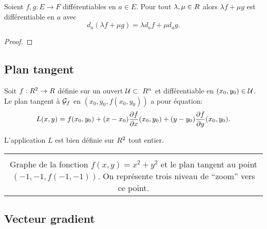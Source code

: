 \begin{proposition}
    Soient $f,g: E \to F$ différentiables en $a\in E$. Pour tout $\lambda,\mu\in R$ alors $\lambda f + \mu g$ est différentiable en $a$ avec 
    \[
        d_a (\lambda f + \mu g) = \lambda d_a f + \mu d_a g.
    \]
\end{proposition}

\begin{proof}
    \pl{\rep{4cm}}
\end{proof}

\sld{\vfill\pagebreak[5]}%
\subsection{Plan tangent}
\begin{proposition}
    Soit $f:R^2 \to R$ définie sur un ouvert $\U\subset  \R^n$ et différentiable en $(x_0,y_0) \in \mathcal{U}$. Le plan tangent à $\mathcal{G}_f$ en $(x_0,y_0,f(x_0,y_0))$ a pour équation:
    \[
        L(x,y) = f(x_0,y_0) + (x-x_0) \frac{\partial f}{\partial x}(x_0,y_0)  + (y-y_0) \frac{\partial f}{\partial y}(x_0,y_0). 
    \]
\end{proposition}

\begin{remark}
    L'application $L$ est bien définie sur $R^2$ tout entier.
\end{remark}

\begin{center}
    \begin{tabular}{c}
        {\small }\\
        \begin{minipage}{.8\textwidth}
            Graphe de la fonction $f(x,y) = x^2 + y^2$ et le plan tangent au point $(-1,-1,f(-1,-1))$. On représente trois niveau de ``zoom'' vers
            ce point. %
        \end{minipage}
    \end{tabular}
\end{center}

\sld{\vfill\pagebreak[5]}%
\subsection{Vecteur gradient}

